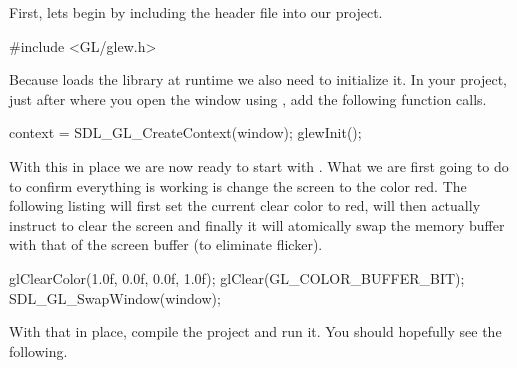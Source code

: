 \documentclass[10pt]{article}
\begin{document}
First, lets begin by including the  header file into our project.

\begin{Listing}

  #include <GL/glew.h>

\end{Listing}

Because  loads the  library at runtime we also
need to initialize it.  In your project, just after where you open the
 window using , add the following
function calls.

\begin{Listing}

  context = SDL_GL_CreateContext(window);
  glewInit();

\end{Listing}


With this in place we are now ready to start with . What
we are first going to do to confirm everything is working is change
the screen to the color red. The following listing will first set the
current  clear color to red, will then actually instruct
 to clear the screen and finally it will atomically swap
the  memory buffer with that of the screen buffer (to
eliminate flicker).

\begin{Listing}

  glClearColor(1.0f, 0.0f, 0.0f, 1.0f);
  glClear(GL_COLOR_BUFFER_BIT);
  SDL_GL_SwapWindow(window);

\end{Listing}

With that in place, compile the project and run it. You should hopefully
see the following.

\end{document}
